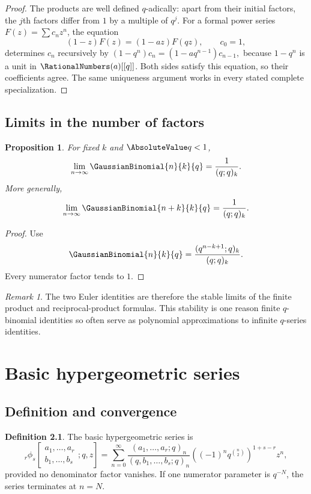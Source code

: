 \documentclass[11pt,a4paper,oneside,openany]{book}
\newtheorem{proposition}[proposition]{Proposition}
\theoremstyle{definition}
\newtheorem{definition}[definition]{Definition}
\theoremstyle{remark}
\newtheorem{remark}[remark]{Remark}
\begin{document}
\begin{proof}
The products are well defined $q$-adically: apart from their initial factors, the $j$th factors differ from $1$ by a multiple of $q^j$.  For a formal power series $F(z)=\sum c_nz^n$, the equation
\[
 (1-z)F(z)=(1-az)F(qz),\qquad c_0=1,
\]
determines $c_n$ recursively by
\(
 (1-q^n)c_n=(1-aq^{n-1})c_{n-1},
\)
because $1-q^n$ is a unit in $\RationalNumbers(a)[[q]]$.  Both sides satisfy this equation, so their coefficients agree.  The same uniqueness argument works in every stated complete specialization.
\end{proof}

\section{Limits in the number of factors}

\begin{proposition}\label{prop:fixed-k-limit}
For fixed $k$ and $\AbsoluteValue q<1$,
\[
 \lim_{n\to\infty}\GaussianBinomial{n}{k}{q}=\frac1{(q;q)_k}.
\]
More generally,
\[
 \lim_{n\to\infty}\GaussianBinomial{n+k}{k}{q}=\frac1{(q;q)_k}.
\]
\end{proposition}

\begin{proof}
Use
\[
 \GaussianBinomial{n}{k}{q}=\frac{(q^{n-k+1};q)_k}{(q;q)_k}.
\]
Every numerator factor tends to $1$.
\end{proof}

\begin{remark}
The two Euler identities are therefore the stable limits of the finite product and reciprocal-product formulas.  This stability is one reason finite $q$-binomial identities so often serve as polynomial approximations to infinite $q$-series identities.
\end{remark}

\chapter{Basic hypergeometric series}\label{chap:basic-hypergeometric}

\section{Definition and convergence}

\begin{definition}
The basic hypergeometric series is
\[
 {}_r\phi_s\!\left[
 \begin{matrix}a_1,\dots,a_r\\ b_1,\dots,b_s\end{matrix};q,z\right]
 =\sum_{n=0}^{\infty}
 \frac{(a_1,\dots,a_r;q)_n}{(q,b_1,\dots,b_s;q)_n}
 \left((-1)^nq^{\binom n2}\right)^{1+s-r}z^n,
\]
provided no denominator factor vanishes.  If one numerator parameter is $q^{-N}$, the series terminates at $n=N$.
\end{definition}
\end{document}
